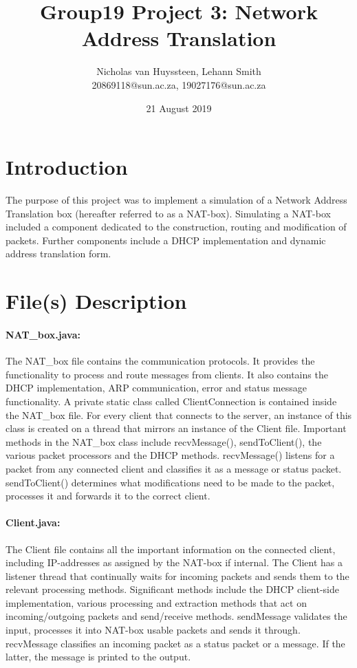 \documentclass[12pt, a4paper]{article}
\title{Group19 Project 3: Network Address Translation}
\author{Nicholas van Huyssteen, Lehann Smith\\
	\small{20869118@sun.ac.za, 19027176@sun.ac.za}
}
\date{21 August 2019}
\begin{document}
\maketitle

\section{Introduction}
The purpose of this project was to implement a simulation of a Network Address Translation box (hereafter referred to as a NAT-box). Simulating a NAT-box included a component dedicated to the construction, routing and modification of packets. Further components include a DHCP implementation and dynamic address translation form.

\section{File(s) Description}
\paragraph{NAT\_box.java:}
The NAT\_box file contains the communication protocols. It provides the functionality to process and route messages from clients. It also contains the DHCP implementation, ARP communication, error and status message functionality. A private static class called ClientConnection is contained inside the NAT\_box file. For every client that connects to the server, an instance of this class is created on a thread that mirrors an instance of the Client file.
Important methods in the NAT\_box class include recvMessage(), sendToClient(), the various packet processors and the DHCP methods.
recvMessage() listens for a packet from any connected client and classifies it as a message or status packet.
sendToClient() determines what modifications need to be made to the packet, processes it and forwards it to the correct client.

\paragraph{Client.java:}
The Client file contains all the important information on the connected client, including IP-addresses as assigned by the NAT-box if internal. The Client has a listener thread that continually waits for incoming packets and sends them to the relevant processing methods. Significant methods include the DHCP client-side implementation, various processing and extraction methods that act on incoming/outgoing packets and send/receive methods.
sendMessage validates the input, processes it into NAT-box usable packets and sends it through.
recvMessage classifies an incoming packet as a status packet or a message. If the latter, the message is printed to the output.
\end{document}
